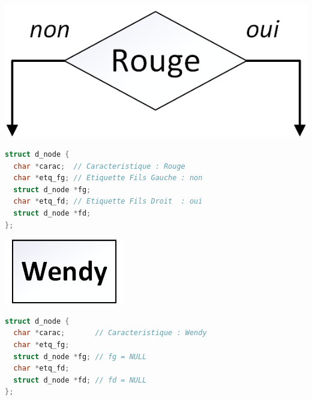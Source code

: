 \documentclass[11pt,a4paper]{article}
\begin{document}
\begin{table}[ht!]
  \centering
  \begin{minipage}{0.30\textwidth}
    \centering

\begin{center}
\includegraphics[scale=0.55]{img/DecisionTree_Node_dec.png}
\end{center}

  \end{minipage}
  \hfillx
  \begin{minipage}{0.70\textwidth}
    \centering

\begin{lstlisting}[language=C,commentstyle=\color{commentgreen}]
struct d_node {
  char *carac;  // Caracteristique : Rouge
  char *etq_fg; // Etiquette Fils Gauche : non
  struct d_node *fg;
  char *etq_fd; // Etiquette Fils Droit  : oui
  struct d_node *fd;
}; \end{lstlisting}

  \end{minipage}
\end{table}

\vspace*{-1.0cm}

\begin{table}[ht!]
  \centering
  \begin{minipage}{0.30\textwidth}
    \centering

\begin{center}
\includegraphics[scale=0.80]{img/DecisionTree_Node_name.png}
\end{center}

  \end{minipage}
  \hfillx
  \begin{minipage}{0.70\textwidth}
    \centering

\begin{lstlisting}[language=C,commentstyle=\color{commentgreen}]
struct d_node {
  char *carac;       // Caracteristique : Wendy
  char *etq_fg;
  struct d_node *fg; // fg = NULL
  char *etq_fd;
  struct d_node *fd; // fd = NULL
}; \end{lstlisting}

  \end{minipage}
\end{table}
\end{document}

